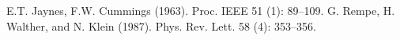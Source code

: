 \documentclass[atoms,article,submit,moreauthors,pdftex,12pt,a4paper]{mdpi}
\begin{document}

\makeatletter
\renewcommand\@biblabel[1]{#1. }
\makeatother
\begin{thebibliography}{999} %
E.T. Jaynes, F.W. Cummings (1963). Proc. IEEE 51 (1): 89–109. 
G. Rempe, H. Walther, and N. Klein (1987). Phys. Rev. Lett. 58 (4): 353–356.

\end{thebibliography}
\end{document}
